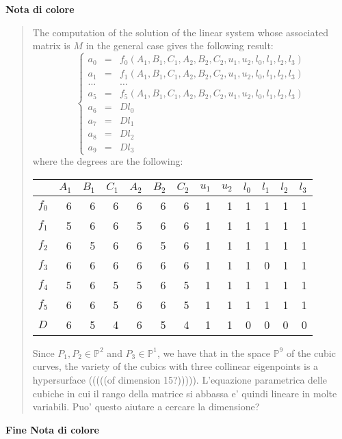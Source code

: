 \documentclass{amsart}
\theoremstyle{plain}
\theoremstyle{definition}
\begin{document}
\noindent
\textbf{Nota di colore}
\begin{quote}
The computation of the solution of the linear system whose associated
matrix is $M$ in the general case gives the following
result:
\[
\left\{
\begin{array}{rcl}
  a_0 & = & f_0(A_1, B_1, C_1, A_2, B_2, C_2, u_1, u_2, l_0, l_1, l_2, l_3) \\
  a_1 & = & f_1(A_1, B_1, C_1, A_2, B_2, C_2, u_1, u_2, l_0, l_1, l_2, l_3) \\
  \dots & & \dots \\
  a_5 & = & f_5(A_1, B_1, C_1, A_2, B_2, C_2, u_1, u_2, l_0, l_1, l_2, l_3) \\
  a_6 & = & D l_0\\
  a_7 & = & D l_1\\
  a_8 & = & D l_2\\
  a_9 &=& D l_3
\end{array}
\right.
\]
where the degrees are the following:

\begin{tabular}{|l|rrrrrrrrrrrr|} \hline
  & $A_{1}$ & $B_{1}$ & $C_{1}$ & $A_{2}$ & $B_{2}$ & $C_{2}$ &
  $u_{1}$ & $u_{2}$ & $l_0$ & $l_1$ & $l_2$ & $l_3$ \\ \hline
$f_0$& 6 & 6 & 6 & 6 & 6 & 6 & 1 & 1 & 1 & 1 & 1 & 1 \\
$f_1$& 5 & 6 & 6 & 5 & 6 & 6 & 1 & 1 & 1 & 1 & 1 & 1 \\
$f_2$& 6 & 5 & 6 & 6 & 5 & 6 & 1 & 1 & 1 & 1 & 1 & 1 \\
$f_3$& 6 & 6 & 6 & 6 & 6 & 6 & 1 & 1 & 1 & 0 & 1 & 1 \\
$f_4$& 5 & 6 & 5 & 5 & 6 & 5 & 1 & 1 & 1 & 1 & 1 & 1 \\
$f_5$& 6 & 6 & 5 & 6 & 6 & 5 & 1 & 1 & 1 & 1 & 1 & 1 \\
$D$& 6 & 5 & 4 & 6 & 5 & 4 & 1 & 1 & 0 & 0 & 0 & 0 \\ \hline
\end{tabular}

Since $P_1, P_2 \in \mathbb{P}^2$ and $P_3 \in
\mathbb{P}^1$, we have that in the space $\mathbb{P}^9$ of the cubic
curves, the variety of the cubics with three collinear eigenpoints is
a hypersurface (((((of dimension 15?))))).
L'equazione parametrica delle cubiche in cui il rango della matrice si
abbassa e' quindi lineare in molte variabili. Puo' questo aiutare a cercare
la dimensione?
\end{quote}
\textbf{Fine Nota di colore}

\end{document}

